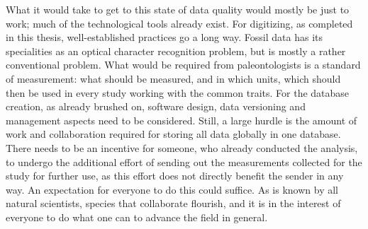 \documentclass[english,twoside,openright]{UH_DS_MSc}
\begin{document}
What it would take to get to this state of data quality would mostly be just to work; much of the technological tools already exist. For digitizing, as completed in this thesis, well-established practices go a long way. Fossil data has its specialities as an optical character recognition problem, but is mostly a rather conventional problem.
What would be required from paleontologists is a standard of measurement: what should be measured, and in which units, which should then be used in every study working with the common traits. For the database creation, as already brushed on, software design, data versioning and management aspects need to be considered. Still, a large hurdle is the amount of work and collaboration required for storing all data globally in one database. There needs to be an incentive for someone, who already conducted the analysis, to undergo the additional effort of sending out the measurements collected for the study for further use, as this effort does not directly benefit the sender in any way. An expectation for everyone to do this could suffice. As is known by all natural scientists, species that collaborate flourish, and it is in the interest of everyone to do what one can to advance the field in general.



\cleardoublepage %


\end{document}
